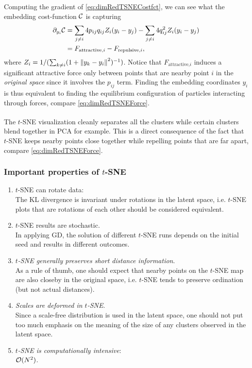 Computing the gradient of \ref{eq:dimRedTSNECostfct}, we can see what the embedding cost-function $\mathcal{C}$ is capturing
\begin{align}
	\label{eq:dimRedTSNEForce}
	\partial_{y_i} \mathcal{C}&=\sum_{j\neq i} 4 p_{ij} q_{ij} Z_i(y_i-y_j) - \sum_{j\neq i} 4 q^2_{ij} Z_i(y_i-y_j)\nonumber \\
	&= F_{\text{attractive,}i} -F_{\text{repulsive,}i},
\end{align}
where $Z_i=1/(\sum_{k\neq i} (1+\norm{y_k-y_i}^2)^{-1})$. Notice that $F_{\text{attractive,}i}$ induces a significant attractive force only between points that are nearby point $i$ in the \emph{original space} since it involves the $p_{ij}$ term. Finding the embedding coordinates $y_i$ is thus equivalent to finding the equilibrium configuration of particles interacting through forces, compare \ref{eq:dimRedTSNEForce}.\\
\\
The $t$-SNE visualization cleanly separates all the clusters while certain clusters blend together in PCA for example. This is a direct consequence of the fact that $t$-SNE keeps nearby points close together while repelling points that are far apart, compare \ref{eq:dimRedTSNEForce}.

\subsubsection{Important properties of $t$-SNE}
\begin{enumerate}
\item $t$-SNE can rotate data:\\
The KL divergence is invariant under rotations in the latent space, i.e. $t$-SNE plots that are rotations of each other should be considered equivalent.
\item $t$-SNE results are stochastic.\\
In applying GD, the solution of different $t$-SNE runs depends on the initial seed and results in different outcomes.
\item \emph{$t$-SNE generally preserves short distance information}.\\
As a rule of thumb, one should expect that nearby points on the $t$-SNE map are also closeby in the original space, i.e. $t$-SNE tends to preserve ordination (but not actual distances).
\item \emph{Scales are deformed in $t$-SNE}.\\
Since a scale-free distribution is used in the latent space, one should not put too much emphasis on the meaning of the size of any clusters observed in the latent space.
\item \emph{$t$-SNE is computationally intensive}:\\
$\mathcal{O}(N^2)$.
\end{enumerate}





